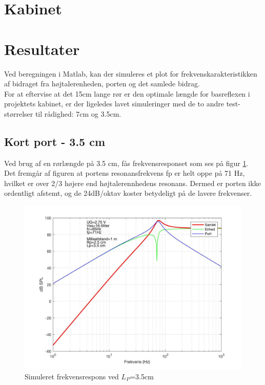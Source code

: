 \section{Kabinet}


\section{Resultater}

Ved beregningen i Matlab, kan der simuleres et plot for frekvenskarakteristikken af bidraget fra højtalerenheden, porten og det samlede bidrag. \\

For at eftervise at det 15cm lange rør er den optimale længde for basreflexen i projektets kabinet, er der ligeledes lavet simuleringer med de to andre test-størrelser til rådighed: 7cm og 3.5cm.\\

\subsection{Kort port - 3.5 cm}

Ved brug af en rørlængde på 3.5 cm, fås frekvensresponset som ses på figur \ref{fig:sim_kort}. \\
Det fremgår af figuren at portens resonansfrekvens fp er helt oppe på 71 Hz, hvilket er over 2/3 højere end højtalerennhedens resonans. Dermed er porten ikke ordentligt afstemt, og de 24dB/oktav koster betydeligt på de lavere frekvenser. 

\begin{figure}[h!]
	\centering
	\includegraphics[width=.8\textwidth]{Pics/sim_kort}
	\caption{Simuleret frekvensrespons ved $L_P$=3.5cm } 
	\label{fig:sim_kort}
\end{figure}

